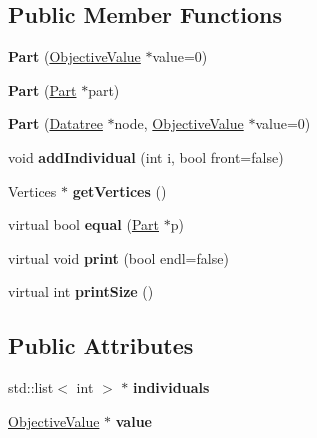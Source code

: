 \subsection*{Public Member Functions}
\begin{DoxyCompactItemize}
\item 
\hypertarget{classPart_a529e3046eef59e036be4a28293e1d696}{{\bfseries Part} (\hyperlink{classObjectiveValue}{Objective\-Value} $\ast$value=0)}\label{classPart_a529e3046eef59e036be4a28293e1d696}

\item 
\hypertarget{classPart_a4fc5eedff4d310041e3ebee54693f4ac}{{\bfseries Part} (\hyperlink{classPart}{Part} $\ast$part)}\label{classPart_a4fc5eedff4d310041e3ebee54693f4ac}

\item 
\hypertarget{classPart_abbe62c3accdcc1234035cd8149b540f0}{{\bfseries Part} (\hyperlink{classDatatree}{Datatree} $\ast$node, \hyperlink{classObjectiveValue}{Objective\-Value} $\ast$value=0)}\label{classPart_abbe62c3accdcc1234035cd8149b540f0}

\item 
\hypertarget{classPart_aa711a575b6b5bb0080b4e9fa7e20bbe1}{void {\bfseries add\-Individual} (int i, bool front=false)}\label{classPart_aa711a575b6b5bb0080b4e9fa7e20bbe1}

\item 
\hypertarget{classPart_aa5a500dd200b320ffd3a51868cc79fb0}{Vertices $\ast$ {\bfseries get\-Vertices} ()}\label{classPart_aa5a500dd200b320ffd3a51868cc79fb0}

\item 
\hypertarget{classPart_a8b37a2433f60fba0c5dcce393e4f5a86}{virtual bool {\bfseries equal} (\hyperlink{classPart}{Part} $\ast$p)}\label{classPart_a8b37a2433f60fba0c5dcce393e4f5a86}

\item 
\hypertarget{classPart_a2d3c13012c781d8651b820e60d57c724}{virtual void {\bfseries print} (bool endl=false)}\label{classPart_a2d3c13012c781d8651b820e60d57c724}

\item 
\hypertarget{classPart_a501f9fdbc4efd9ce00e1eef4a07f033e}{virtual int {\bfseries print\-Size} ()}\label{classPart_a501f9fdbc4efd9ce00e1eef4a07f033e}

\end{DoxyCompactItemize}
\subsection*{Public Attributes}
\begin{DoxyCompactItemize}
\item 
\hypertarget{classPart_a12f364b91efb5702af492cbdef1990fe}{std\-::list$<$ int $>$ $\ast$ {\bfseries individuals}}\label{classPart_a12f364b91efb5702af492cbdef1990fe}

\item 
\hypertarget{classPart_af9f5786f51cc11cffcf5c77ea656ae40}{\hyperlink{classObjectiveValue}{Objective\-Value} $\ast$ {\bfseries value}}\label{classPart_af9f5786f51cc11cffcf5c77ea656ae40}

\end{DoxyCompactItemize}


